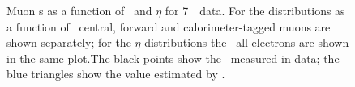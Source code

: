 \begin{figure}[h]
\centering
\vspace{-8mm}
    \caption[Muon \FakeFactor s as a function of \pt\ and $\eta$ for 7~\tev\ data.]
    {Muon \FakeFactor s as a function of \pt\ and $\eta$ for 7~\tev\ data. 
    For the distributions as a function of \pt\, central, forward and calorimeter-tagged muons are shown
    separately; for the $\eta$ distributions the \ffactor\ all electrons are
    shown in the same plot.The black points show the \ffactor\ measured in
    data; the blue triangles show the value estimated by \mc.}
\label{fig:ff-mu-seven} 
\end{figure}


